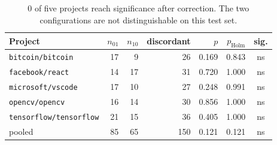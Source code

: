 \begin{table}[htbp]
\centering
\caption{Per-project model against pooled model, exact McNemar.}
\label{tab:significance}
\begin{tabular}{lrrrrrc}
\toprule
Project & $n_{01}$ & $n_{10}$ & discordant & $p$ & $p_{\text{Holm}}$ & sig. \\
\midrule
\texttt{bitcoin/bitcoin} & 17 & 9 & 26 & 0.169 & 0.843 & ns \\
\texttt{facebook/react} & 14 & 17 & 31 & 0.720 & 1.000 & ns \\
\texttt{microsoft/vscode} & 17 & 10 & 27 & 0.248 & 0.991 & ns \\
\texttt{opencv/opencv} & 16 & 14 & 30 & 0.856 & 1.000 & ns \\
\texttt{tensorflow/tensorflow} & 21 & 15 & 36 & 0.405 & 1.000 & ns \\
pooled & 85 & 65 & 150 & 0.121 & 0.121 & ns \\
\bottomrule
\end{tabular}
\caption*{\footnotesize 0 of five projects reach significance after correction. The two configurations are not distinguishable on this test set.}
\end{table}
